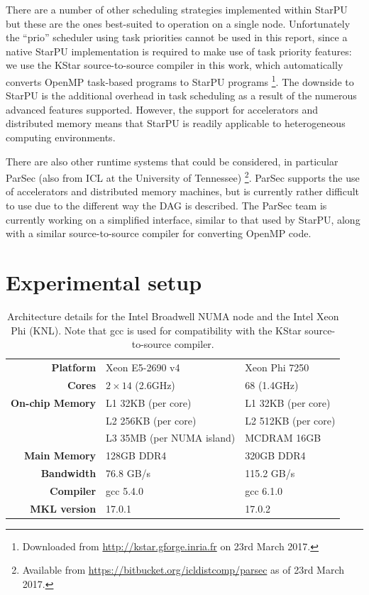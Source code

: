 \documentclass[a4paper,12pt]{article}
\begin{document}
There are a number of other scheduling strategies implemented within
StarPU but these are the ones best-suited to
operation on a single node.
Unfortunately the ``prio'' scheduler using task priorities cannot be
used in this report,
since a native StarPU implementation is required to
make use of task priority features:
we use the KStar source-to-source compiler in this work,
which automatically converts OpenMP task-based programs to
StarPU programs%
\footnote{Downloaded from \url{http://kstar.gforge.inria.fr} on
  23rd March 2017.}.
The downside to StarPU is the additional overhead in task scheduling
as a result of the numerous advanced features supported.
However,
the support for accelerators and distributed memory
means that StarPU is readily applicable to heterogeneous computing
environments.

There are also other runtime systems that could be considered,
in particular ParSec (also from ICL at the University of Tennessee)%
\footnote{Available from
  \url{https://bitbucket.org/icldistcomp/parsec} as of 23rd March 2017.}.
ParSec supports the use of accelerators and distributed memory machines,
but is currently rather difficult to use due to the
different way the DAG is described.
The ParSec team is currently working on a simplified interface,
similar to that used by StarPU,
along with a similar source-to-source compiler for converting OpenMP code.

\section{Experimental setup}
\label{sec.arch}

\begin{table}[t]
  \centering
  \caption{Architecture details for the Intel Broadwell NUMA node and
    the Intel Xeon Phi (KNL).
    Note that gcc is used for compatibility with the KStar
    source-to-source compiler.}
  \vspace{.5em}
  \begin{tabular}{|r | l | l |}
    \hline
    \textbf{Platform} & Xeon E5-2690 v4 & Xeon Phi 7250\\
    \textbf{Cores}    & $2 \times 14$ (2.6GHz) & 68 (1.4GHz)\\
    \textbf{On-chip Memory} & L1 32KB (per core) & L1 32KB (per core)\\
                      & L2 256KB (per core) & L2 512KB (per core)\\
                      & L3 35MB (per NUMA island)  & MCDRAM 16GB\\
    \textbf{Main Memory} & 128GB DDR4 & 320GB DDR4\\
    \textbf{Bandwidth} & 76.8 GB/s & 115.2 GB/s\\
    \textbf{Compiler} & gcc 5.4.0 & gcc 6.1.0\\
    \textbf{MKL version} & 17.0.1 & 17.0.2\\
    \hline
  \end{tabular}
  \label{tab.arch}
\end{table}
\end{document}
